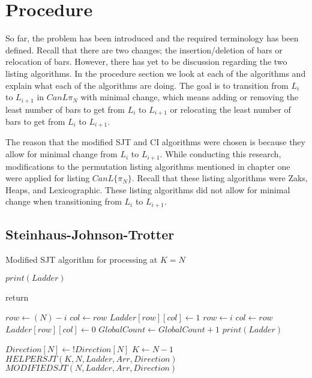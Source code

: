 \section{Procedure}

So far, the problem has been introduced and the required terminology has been defined. Recall that there are two 
changes; the insertion/deletion of bars or relocation of bars.
However, there has yet to be discussion regarding the two 
listing algorithms. In the procedure section 
we look at each of the algorithms and explain what 
each of the algorithms are doing. The goal is to transition from 
$L_{i}$ to $L_{i+1}$ in $CanL{\pi_{N}}$ with minimal change, which means adding or removing 
the least number of bars to get from $L_{i}$ to $L_{i+1}$ or relocating 
the least number of bars to get from $L_{i}$ to $L_{i+1}$.\par 

The reason that the modified SJT and CI algorithms were chosen is because they allow 
for minimal change from $L_{i}$ to $L_{i+1}$. While conducting this research, modifications 
to the permutation listing algorithms mentioned in chapter one were applied for listing $CanL\{\pi_{N}\}$. Recall that 
these listing algorithms were Zaks, Heaps, and Lexicographic. These listing algorithms 
did not allow for minimal change when transitioning from $L_{i}$ to $L_{i+1}$.
\subsection{Steinhaus-Johnson-Trotter}
\begin{algorithm}
  \caption{Modified SJT algorithm for processing at $K=N$}
  \begin{algorithmic}[1]


      \State $print(Ladder)$

        \State return
      \EndIf

     
        
            \State $row \gets (N) - i$
            \State $col \gets row$
            \State $Ladder[row][col] \gets 1$
        \Else
            \State $row \gets i$
            \State $col \gets row$
            \State $Ladder[row][col] \gets 0$
        \EndIf
        \State $GlobalCount \gets GlobalCount+1$
        \State $print(Ladder)$

      \EndFor
      \State $Direction[N] \gets !Direction[N]$
      \State $K \gets N-1$
      \State $HELPERSJT(K, N, Ladder, Arr, Direction)$
      \State $MODIFIEDSJT(N,  Ladder, Arr, Direction)$

    \EndFunction
  \end{algorithmic}
\end{algorithm}

